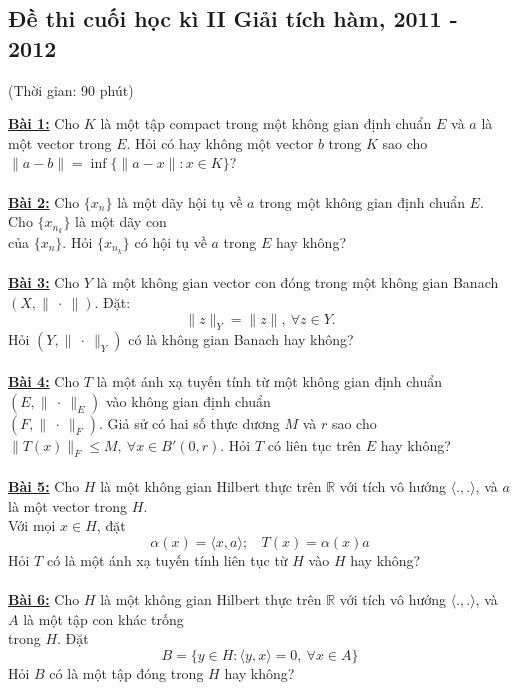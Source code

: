 \documentclass[10pt, a4paper]{article}
\begin{document}
\newpage

\subsection{Đề thi cuối học kì II Giải tích hàm, 2011 - 2012}
\begin{center}
	\color{blue}(Thời gian: 90 phút)
\end{center}
\color{red}\underline{\textbf{Bài 1:}} \color{black}Cho $K$ là một tập compact trong một không gian định chuẩn $E$ và $a$ là một vector trong $E$. Hỏi có hay không một vector $b$ trong $K$ sao cho $\lVert a-b\rVert=\inf\{\lVert a-x\rVert:x\in K\}$?\\\\
\color{red}\underline{\textbf{Bài 2:}} \color{black}Cho $\{x_n\}$ là một dãy hội tụ về $a$ trong một không gian định chuẩn $E$. Cho $\{x_{n_k}\}$ là một dãy con\\ của $\{x_n\}$. Hỏi $\{x_{n_k}\}$ có hội tụ về $a$ trong $E$ hay không?\\\\
\color{red}\underline{\textbf{Bài 3:}} \color{black}Cho $Y$ là một không gian vector con đóng trong một không gian Banach $(X,\lVert~\cdot~\rVert)$. Đặt: $$\lVert z\rVert_Y=\lVert z\rVert,~\forall z\in Y.$$ Hỏi $(Y,\lVert~\cdot~\rVert_Y)$ có là không gian Banach hay không?\\\\
\color{red}\underline{\textbf{Bài 4:}} \color{black}Cho $T$ là một ánh xạ tuyến tính từ một không gian định chuẩn $(E,\lVert~\cdot~\rVert_E)$ vào không gian định chuẩn\\ $(F,\lVert~\cdot~\rVert_F)$. Giả sử có hai số thực dương $M$ và $r$ sao cho $\lVert T(x)\rVert_F\le M,~\forall x\in B'(0,r)$. Hỏi $T$ có liên tục trên $E$ hay không?\\\\
\color{red}\underline{\textbf{Bài 5:}} \color{black}Cho $H$ là một không gian Hilbert thực trên $\mathbb R$ với tích vô hướng $\langle.,.\rangle$, và $a$ là một
vector trong $H$.\\ Với mọi $x\in H$, đặt $$\alpha(x)=\langle x,a\rangle;~~~~T(x)=\alpha(x)a$$
Hỏi $T$ có là một ánh xạ tuyến tính liên tục từ $H$ vào $H$ hay không?\\\\
\color{red}\underline{\textbf{Bài 6:}} \color{black}Cho $H$ là một không gian Hilbert thực trên $\mathbb R$ với tích vô hướng $\langle.,.\rangle$, và $A$ là một tập con khác trống\\ trong $H$. Đặt $$B=\{y\in H:\langle y,x\rangle=0,~\forall x\in A\}$$
Hỏi $B$ có là một tập đóng trong $H$ hay không?
\end{document}
